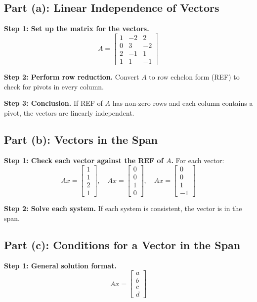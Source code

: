 \documentclass[12pt]{article}
\begin{document}
\subsection*{Part (a): Linear Independence of Vectors}
\textbf{Step 1: Set up the matrix for the vectors.}
\[
A = \begin{bmatrix}
1 & -2 & 2 \\
0 & 3 & -2 \\
2 & -1 & 1 \\
1 & 1 & -1
\end{bmatrix}
\]

\textbf{Step 2: Perform row reduction.} Convert \(A\) to row echelon form (REF) to check for pivots in every column.

\textbf{Step 3: Conclusion.} If REF of \(A\) has non-zero rows and each column contains a pivot, the vectors are linearly independent.

\subsection*{Part (b): Vectors in the Span}
\textbf{Step 1: Check each vector against the REF of \(A\).} For each vector:
\[
Ax = \begin{bmatrix} 1 \\ 1 \\ 2 \\ 1 \end{bmatrix}, \quad Ax = \begin{bmatrix} 0 \\ 0 \\ 1 \\ 0 \end{bmatrix}, \quad Ax = \begin{bmatrix} 0 \\ 0 \\ 1 \\ -1 \end{bmatrix}
\]

\textbf{Step 2: Solve each system.} If each system is consistent, the vector is in the span.

\subsection*{Part (c): Conditions for a Vector in the Span}
\textbf{Step 1: General solution format.}
\[
Ax = \begin{bmatrix} a \\ b \\ c \\ d \end{bmatrix}
\]
\end{document}
